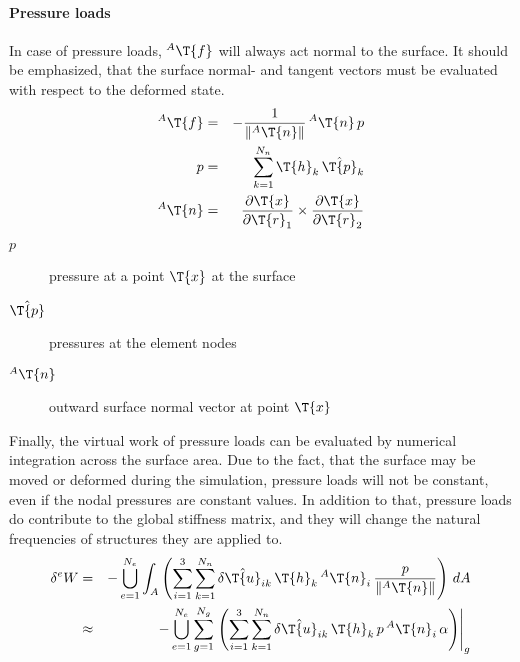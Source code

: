\paragraph{Pressure loads}
In case of pressure loads, ${^A}\T{f}$ will always act normal to the surface.
It should be emphasized, that the surface normal- and tangent vectors must be evaluated with respect to the deformed state.
\begin{eqnarray}
{^A}\T{f} & = & -\frac{1}{\left\Vert{^A}\T{n}\right\Vert} \, {^A}\T{n} \, p \\
p & = & \sum_{k=1}^{N_n} \T{h}_{k} \, \hat{\T{p}}_k \\
{^A}\T{n} & = & \frac{\partial \T{x}}{\partial \T{r}_1} \times \frac{\partial \T{x}}{\partial \T{r}_2}
\end{eqnarray}
\begin{description}
\item[$p$] pressure at a point $\T{x}$ at the surface
\item[$\hat{\T{p}}$] pressures at the element nodes
\item[${^A}\T{n}$] outward surface normal vector at point $\T{x}$
\end{description}
Finally, the virtual work of pressure loads can be evaluated by numerical integration across the surface area.
Due to the fact, that the surface may be moved or deformed during the simulation, pressure loads will not be constant,
even if the nodal pressures are constant values. In addition to that, pressure loads do contribute to the global stiffness matrix,
and they will change the natural frequencies of structures they are applied to.
\begin{eqnarray}
\delta{^e}W & = & -\bigcup_{e=1}^{N_e}\int_{A} \left(\sum_{i=1}^3 \sum_{k=1}^{N_n} \delta\hat{\T{u}}_{ik} \, \T{h}_{k} \, {^A}\T{n}_i \, \frac{p}{\left\Vert{^A}\T{n}\right\Vert}\right) \, dA \\
 & \approx & -\bigcup_{e=1}^{N_e}\sum_{g=1}^{N_g} \left.\left(\sum_{i=1}^3 \sum_{k=1}^{N_n} \delta\hat{\T{u}}_{ik} \, \T{h}_{k} \, p \, {^A}\T{n}_i \, \alpha \right)\right\vert_{g}
\end{eqnarray}
